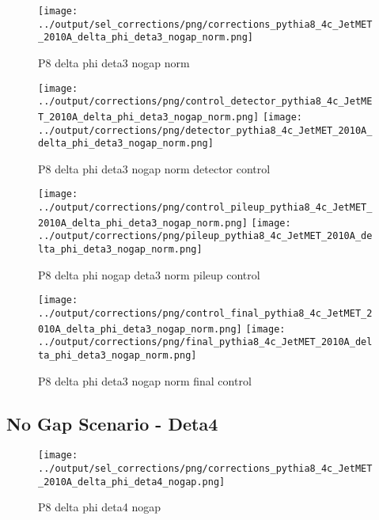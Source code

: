 \documentclass[11pt]{book}
\begin{document}
\begin{figure}[ht]
\centering
\texttt{[image: ../output/sel\_corrections/png/corrections\_pythia8\_4c\_JetMET\_2010A\_delta\_phi\_deta3\_nogap\_norm.png]}
\caption{P8 delta phi deta3 nogap norm}
\label{fig:p8_JetMET_2010A_delta_phi_deta3_nogap_norm}
\end{figure}

\begin{figure}[ht]
\centering
\texttt{[image: ../output/corrections/png/control\_detector\_pythia8\_4c\_JetMET\_2010A\_delta\_phi\_deta3\_nogap\_norm.png]}
\texttt{[image: ../output/corrections/png/detector\_pythia8\_4c\_JetMET\_2010A\_delta\_phi\_deta3\_nogap\_norm.png]}
\caption{P8 delta phi deta3 nogap norm detector control}
\label{fig:p8_JetMET_2010A_delta_phi_deta3_nogap_norm_detector_control}
\end{figure}

\begin{figure}[ht]
\centering
\texttt{[image: ../output/corrections/png/control\_pileup\_pythia8\_4c\_JetMET\_2010A\_delta\_phi\_deta3\_nogap\_norm.png]}
\texttt{[image: ../output/corrections/png/pileup\_pythia8\_4c\_JetMET\_2010A\_delta\_phi\_deta3\_nogap\_norm.png]}
\caption{P8 delta phi nogap deta3 norm pileup control}
\label{fig:p8_JetMET_2010A_delta_phi_deta3_nogap_norm_pileup_control}
\end{figure}


\begin{figure}[ht]
\centering
\texttt{[image: ../output/corrections/png/control\_final\_pythia8\_4c\_JetMET\_2010A\_delta\_phi\_deta3\_nogap\_norm.png]}
\texttt{[image: ../output/corrections/png/final\_pythia8\_4c\_JetMET\_2010A\_delta\_phi\_deta3\_nogap\_norm.png]}
\caption{P8 delta phi deta3 nogap norm final control}
\label{fig:p8_JetMET_2010A_delta_phi_deta3_nogap_norm_final_control}
\end{figure}




\clearpage
\subsection{No Gap Scenario - Deta4}

\begin{figure}[ht]
\centering
\texttt{[image: ../output/sel\_corrections/png/corrections\_pythia8\_4c\_JetMET\_2010A\_delta\_phi\_deta4\_nogap.png]}
\caption{P8 delta phi deta4 nogap}
\label{fig:p8_JetMET_2010A_delta_phi_deta4_nogap}
\end{figure}
\end{document}
